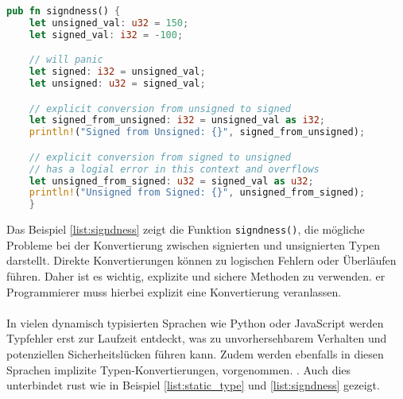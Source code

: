 \begin{lstlisting}[language=Rust, caption={Signiertheit}, label=list:signdness]
pub fn signdness() {
    let unsigned_val: u32 = 150;
    let signed_val: i32 = -100;

    // will panic 
    let signed: i32 = unsigned_val;
    let unsigned: u32 = signed_val;

    // explicit conversion from unsigned to signed
    let signed_from_unsigned: i32 = unsigned_val as i32;
    println!("Signed from Unsigned: {}", signed_from_unsigned);

    // explicit conversion from signed to unsigned
    // has a logial error in this context and overflows
    let unsigned_from_signed: u32 = signed_val as u32;
    println!("Unsigned from Signed: {}", unsigned_from_signed); 
    }
\end{lstlisting}
\noindent
Das Beispiel \ref{list:signdness} zeigt die Funktion \texttt{signdness()}, die mögliche Probleme bei der Konvertierung zwischen signierten und unsignierten Typen darstellt. 
Direkte Konvertierungen können zu logischen Fehlern oder Überläufen führen. 
Daher ist es wichtig, explizite und sichere Methoden zu verwenden. 
er Programmierer muss hierbei explizit eine Konvertierung veranlassen.\\
\\
In vielen dynamisch typisierten Sprachen wie Python oder JavaScript werden Typfehler erst zur Laufzeit entdeckt, was zu unvorhersehbarem Verhalten und potenziellen Sicherheitslücken führen kann. 
Zudem werden ebenfalls in diesen Sprachen implizite Typen-Konvertierungen, vorgenommen. \cite[Kapitel 1: Types]{drysdale2024}.
Auch dies unterbindet rust wie in Beispiel \ref{list:static_type} und \ref{list:signdness} gezeigt.
